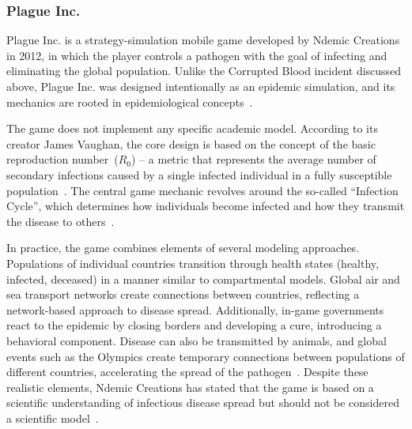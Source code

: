 \documentclass[english]{projectreport}
\begin{document}

\subsubsection{Plague Inc.}
\label{sec:plague-inc}

Plague Inc. is a strategy-simulation mobile game developed by Ndemic
Creations in 2012, in which the player controls a pathogen with the goal
of infecting and eliminating the global population. Unlike the Corrupted
Blood incident discussed above, Plague Inc. was designed intentionally as
an epidemic simulation, and its mechanics are rooted in epidemiological
concepts~\cite{cornellPlagueInc2014}.

The game does not implement any specific academic model. According to its
creator James Vaughan, the core design is based on the concept of the
basic reproduction number~($R_0$) -- a metric that represents the
average number of secondary infections caused by a single infected
individual in a fully susceptible
population~\cite{gideonR02024}. The central game mechanic revolves
around the so-called ``Infection Cycle'', which determines how
individuals become infected and how they transmit the disease to
others~\cite{cornellPlagueInc2014}.

In practice, the game combines elements of several modeling approaches.
Populations of individual countries transition through health states
(healthy, infected, deceased) in a manner similar to compartmental
models. Global air and sea transport networks create connections between
countries, reflecting a network-based approach to disease spread.
Additionally, in-game governments react to the epidemic by closing
borders and developing a cure, introducing a behavioral component.
Disease can also be transmitted by animals, and global events such as the
Olympics create temporary connections between populations of different
countries, accelerating the spread of the
pathogen~\cite{cornellPlagueInc2014}. Despite these
realistic elements, Ndemic Creations has stated that the game is based on
a scientific understanding of infectious disease spread but should not be
considered a scientific model~\cite{cornellPlagueInc2014}.


\end{document}
